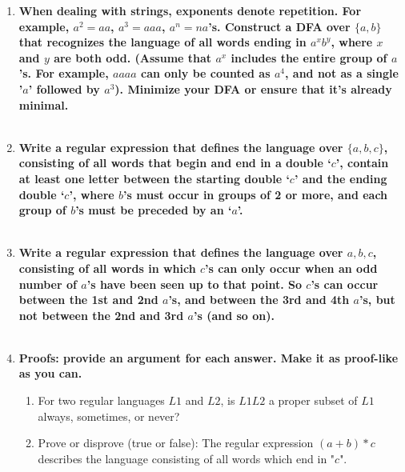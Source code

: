 \begin{enumerate}
\begin{enumerate}
\end{enumerate}

\newpage
\item \textbf{When dealing with strings, exponents denote repetition. For
  example, $a^2=aa$, $a^3=aaa$, $a^n= n a$'s.  Construct a DFA over
  $\{a,b\}$ that recognizes the language of all words ending in $a^xb^y$,
  where $x$ and $y$ are both odd. (Assume that $a^x$ includes the entire group
  of $a$'s.  For example, $aaaa$ can only be counted as $a^4$, and not as a
  single '$a$' followed by $a^3$). Minimize your DFA or ensure that it's
  already minimal.}
\\\\


\newpage
\item \textbf{Write a regular expression that defines the language over
  $\{a,b,c\}$, consisting of all words that begin and end in a double ‘$c$’, contain at least one letter between the starting double ‘$c$’ and the ending double ‘$c$’, where $b$’s must occur in groups of 2  or more, and each group of $b$’s must be preceded by an ‘$a$’.}
\\\\

\newpage
\item \textbf{Write a regular expression that defines the language over
  ${a,b,c}$, consisting of all words in which $c$'s can only occur when an odd
  number of $a$'s have been seen up to that point. So $c$'s can occur between the 1st and 2nd $a$'s, and between the 3rd and 4th $a$'s, but not between the 2nd and 3rd $a$'s (and so on).}
\\\\


\newpage
\item \textbf{Proofs: provide an argument for each answer. Make it as
  proof-like as you can.}
\begin{enumerate}
  \item For two regular languages $L1$ and $L2$, is $L1L2$ a proper subset of
    $L1$ always, sometimes, or never?
  \item Prove or disprove (true or false): The regular expression $(a+b)*c$
    describes the language consisting of all words which end in "$c$".
\end{enumerate}


\end{enumerate}
